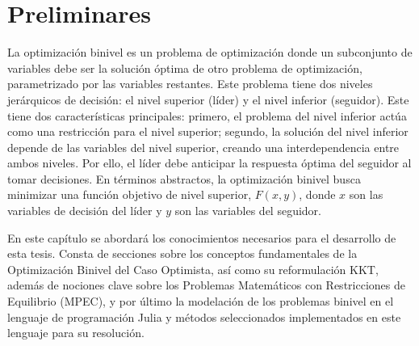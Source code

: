 \chapter{Preliminares}\label{chapter:state-of-the-art}



La optimización binivel es un problema de optimización donde un subconjunto de variables debe ser la solución óptima de otro problema de optimización, parametrizado por las variables restantes. Este problema tiene dos niveles jerárquicos de decisión: el nivel superior (líder) y el nivel inferior (seguidor).
Este tiene dos características principales: primero, el problema del nivel inferior actúa como una restricción para el nivel superior; segundo, la solución del nivel inferior depende de las variables del nivel superior, creando una interdependencia entre ambos niveles. Por ello, el líder debe anticipar la respuesta óptima del seguidor al tomar decisiones.
En términos abstractos, la optimización binivel busca minimizar una función objetivo de nivel superior, $F(x, y)$, donde $x$ son las variables de decisión del líder y $y$ son las variables del seguidor. 

En este capítulo se abordará los conocimientos necesarios para el desarrollo de esta tesis. Consta de secciones sobre los conceptos fundamentales de la Optimización Binivel del Caso Optimista, así como su reformulación KKT,
además de nociones clave sobre los Problemas Matemáticos con Restricciones de Equilibrio (MPEC), 
y por último la modelación de los problemas binivel en el lenguaje de programación Julia y métodos seleccionados implementados en este lenguaje para su resolución. 

